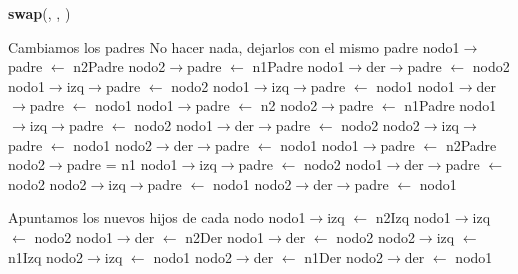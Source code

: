 \begin{Representacion}
\begin{Algoritmos}
\begin{algorithm}[H]{\textbf{swap}(, , )}
\begin{algorithmic}[1]
\begin{scriptsize}
		\Comment Cambiamos los padres
			\State No hacer nada, dejarlos con el mismo padre
		\Else
				\State nodo1$\to$padre $\gets$ n2Padre	
				\State nodo2$\to$padre $\gets$ n1Padre
					\State nodo1$\to$der$\to$padre $\gets$ nodo2
				\EndIf
					\State nodo1$\to$izq$\to$padre $\gets$ nodo2
				\EndIf
					\State nodo1$\to$izq$\to$padre $\gets$ nodo1
				\EndIf
					\State nodo1$\to$der$\to$padre $\gets$ nodo1
				\EndIf
			\Else
					\State nodo1$\to$padre $\gets$ n2
					\State nodo2$\to$padre $\gets$ n1Padre	
						\State nodo1$\to$izq$\to$padre $\gets$ nodo2					
					\EndIf
						\State nodo1$\to$der$\to$padre $\gets$ nodo2					
					\EndIf
						\State nodo2$\to$izq$\to$padre $\gets$ nodo1
					\EndIf
						\State nodo2$\to$der$\to$padre $\gets$ nodo1
					\EndIf
				\Else
						\State nodo1$\to$padre $\gets$ n2Padre
						\State nodo2$\to$padre = n1
							\State nodo1$\to$izq$\to$padre $\gets$ nodo2
						\EndIf
							\State nodo1$\to$der$\to$padre $\gets$ nodo2
						\EndIf
							\State nodo2$\to$izq$\to$padre $\gets$ nodo1
						\EndIf
							\State nodo2$\to$der$\to$padre $\gets$ nodo1
						\EndIf
					\EndIf
				\EndIf
			
				\Comment Apuntamos los nuevos hijos de cada nodo			
				\State nodo1$\to$izq $\gets$ n2Izq
					\State nodo1$\to$izq $\gets$ nodo2
				\EndIf
				\State nodo1$\to$der $\gets$ n2Der
					\State nodo1$\to$der $\gets$ nodo2
				\EndIf
				\State nodo2$\to$izq $\gets$ n1Izq
					\State nodo2$\to$izq $\gets$ nodo1
				\EndIf
				\State nodo2$\to$der $\gets$ n1Der
					\State nodo2$\to$der $\gets$ nodo1
				\EndIf
				

\end{scriptsize}
\end{algorithmic}
\end{algorithm}
\end{Algoritmos}
\end{Representacion}
